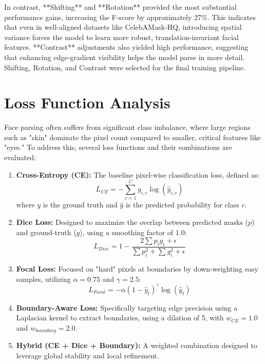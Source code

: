 \documentclass[10pt, a4paper]{article} %
\begin{document}
In contrast, **Shifting** and **Rotation** provided the most substantial performance gains, increasing the F-score by approximately 27\%. This indicates that even in well-aligned datasets like CelebAMask-HQ, introducing spatial variance forces the model to learn more robust, translation-invariant facial features. **Contrast** adjustments also yielded high performance, suggesting that enhancing edge-gradient visibility helps the model parse in more detail. Shifting, Rotation, and Contrast were selected for the final training pipeline.

\section{Loss Function Analysis}

Face parsing often suffers from significant class imbalance, where large regions such as "skin" dominate the pixel count compared to smaller, critical features like "eyes." To address this, several loss functions and their combinations are evaluated:

\begin{enumerate}
    \item \textbf{Cross-Entropy (CE):} The baseline pixel-wise classification loss, defined as:
    \begin{equation}
        L_{CE} = -\sum_{c=1}^C y_{i,c} \log(\hat{y}_{i,c})
    \end{equation}
    where $y$ is the ground truth and $\hat{y}$ is the predicted probability for class $c$.

    \item \textbf{Dice Loss:} Designed to maximize the overlap between predicted masks ($p$) and ground-truth ($g$), using a smoothing factor of $1.0$:
    \begin{equation}
        L_{Dice} = 1 - \frac{2 \sum p_i g_i + \epsilon}{\sum p_i^2 + \sum g_i^2 + \epsilon}
    \end{equation}

    \item \textbf{Focal Loss:} Focused on "hard" pixels at boundaries by down-weighting easy samples, utilizing $\alpha=0.75$ and $\gamma=2.5$:
    \begin{equation}
        L_{Focal} = -\alpha(1 - \hat{y}_t)^\gamma \log(\hat{y}_t)
    \end{equation}

    \item \textbf{Boundary-Aware Loss:} Specifically targeting edge precision using a Laplacian kernel to extract boundaries, using a dilation of 5, with $w_{CE}=1.0$ and $w_{boundary}=2.0$.

    \item \textbf{Hybrid (CE + Dice + Boundary):} A weighted combination designed to leverage global stability and local refinement.
\end{enumerate}
\end{document}
